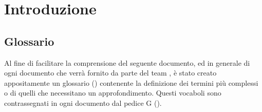 \section{Introduzione}
\subsection{Glossario}
Al fine di facilitare la comprensione del seguente documento, ed in generale di ogni documento che verrà fornito da parte del team \gruppo , è stato creato appositamente un glossario (\textit{\Glossario}) contenente la definizione dei termini più complessi o di quelli che necessitano un approfondimento. Questi vocaboli sono contrassegnati in ogni documento dal pedice G ().